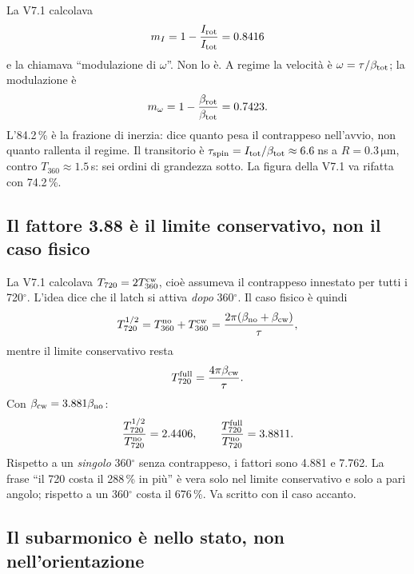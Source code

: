 \documentclass[11pt,a4paper]{article}
\providecommand{\micro}{}
\renewcommand{\micro}{\ensuremath{\mathrm{\mu}}}
\begin{document}
La V7.1 calcolava
\begin{equation}
m_I = 1-\frac{I_{\rm rot}}{I_{\rm tot}} = 0.8416
\end{equation}
e la chiamava ``modulazione di $\omega$''. Non lo è. A regime la velocità è
$\omega=\tau/\beta_{\rm tot}$; la modulazione è
\begin{equation}
m_\omega = 1-\frac{\beta_{\rm rot}}{\beta_{\rm tot}} = 0.7423.
\label{eq:modomega}
\end{equation}
L'84.2\,\% è la frazione di inerzia: dice quanto pesa il contrappeso
nell'avvio, non quanto rallenta il regime. Il transitorio è
$\tau_{\rm spin}=I_{\rm tot}/\beta_{\rm tot}\approx 6.6$\,ns a
$R=0.3\,\micro$m, contro $T_{360}\approx 1.5$\,s: sei ordini di grandezza
sotto. La figura della V7.1 va rifatta con 74.2\,\%.

\subsection{Il fattore 3.88 è il limite conservativo, non il caso fisico}

La V7.1 calcolava $T_{720}=2T_{360}^{\rm cw}$, cioè assumeva il contrappeso
innestato per tutti i 720$^\circ$. L'idea dice che il latch si attiva
\emph{dopo} 360$^\circ$. Il caso fisico è quindi
\begin{equation}
T_{720}^{1/2}=T_{360}^{\rm no}+T_{360}^{\rm cw}
=\frac{2\pi(\beta_{\rm no}+\beta_{\rm cw})}{\tau},
\label{eq:t720half}
\end{equation}
mentre il limite conservativo resta
\begin{equation}
T_{720}^{\rm full}=\frac{4\pi\beta_{\rm cw}}{\tau}.
\label{eq:t720full}
\end{equation}
Con $\beta_{\rm cw}=3.881\beta_{\rm no}$:
\begin{equation}
\frac{T_{720}^{1/2}}{T_{720}^{\rm no}}=2.4406,\qquad
\frac{T_{720}^{\rm full}}{T_{720}^{\rm no}}=3.8811.
\end{equation}
Rispetto a un \emph{singolo} 360$^\circ$ senza contrappeso, i fattori sono
4.881 e 7.762. La frase ``il 720 costa il 288\,\% in più'' è vera solo nel
limite conservativo e solo a pari angolo; rispetto a un 360$^\circ$ costa il
676\,\%. Va scritto con il caso accanto.

\subsection{Il subarmonico è nello stato, non nell'orientazione}
\end{document}
